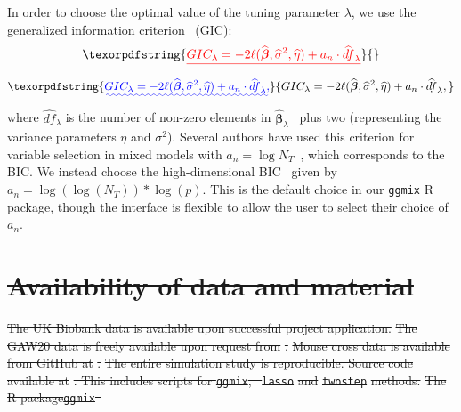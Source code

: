 \documentclass[10pt,letterpaper]{article}
\newcommand{\ggmix}{\texttt{ggmix}}
\newcommand{\bbeta}{\boldsymbol{\beta}}
\providecommand{\DIFaddtex}[1]{{\protect\color{blue}\uwave{#1}}} %
\providecommand{\DIFdeltex}[1]{{\protect\color{red}\sout{#1}}}                      %
\providecommand{\DIFaddbegin}{} %
\providecommand{\DIFaddend}{} %
\providecommand{\DIFdelbegin}{} %
\providecommand{\DIFdelend}{} %
\providecommand{\DIFadd}[1]{\texorpdfstring{\DIFaddtex{#1}}{#1}} %
\providecommand{\DIFdel}[1]{\texorpdfstring{\DIFdeltex{#1}}{}} %
\newcommand{\DIFscaledelfig}{0.5}
\newlength{\DIFdelgraphicswidth} %
\newlength{\DIFdelgraphicsheight} %
\newcommand{\DIFaddincludegraphics}[2][]{{\color{blue}\fbox{\DIFOincludegraphics[#1]{#2}}}} %
\newcommand{\DIFdelincludegraphics}[2][]{%
\sbox{\DIFdelgraphicsbox}{\DIFOincludegraphics[#1]{#2}}%
\settoboxwidth{\DIFdelgraphicswidth}{\DIFdelgraphicsbox} %
\settoboxtotalheight{\DIFdelgraphicsheight}{\DIFdelgraphicsbox} %
\scalebox{\DIFscaledelfig}{%
\parbox[b]{\DIFdelgraphicswidth}{\usebox{\DIFdelgraphicsbox}\\[-\baselineskip] \rule{\DIFdelgraphicswidth}{0em}}\llap{\resizebox{\DIFdelgraphicswidth}{\DIFdelgraphicsheight}{%
\setlength{\unitlength}{\DIFdelgraphicswidth}%
\begin{picture}(1,1)%
\thicklines\linethickness{2pt} %
{\color[rgb]{1,0,0}\put(0,0){\framebox(1,1){}}}%
{\color[rgb]{1,0,0}\put(0,0){\line( 1,1){1}}}%
{\color[rgb]{1,0,0}\put(0,1){\line(1,-1){1}}}%
\end{picture}%
}\hspace*{3pt}}} %
} %
\DeclareRobustCommand{\DIFaddbegin}{\DIFOaddbegin \let\includegraphics\DIFaddincludegraphics} %
\DeclareRobustCommand{\DIFaddend}{\DIFOaddend \let\includegraphics\DIFOincludegraphics} %
\DeclareRobustCommand{\DIFdelbegin}{\DIFOdelbegin \let\includegraphics\DIFdelincludegraphics} %
\DeclareRobustCommand{\DIFdelend}{\DIFOaddend \let\includegraphics\DIFOincludegraphics} %
\begin{document}
In order to choose the optimal value of the tuning parameter $\lambda$, we use the generalized information criterion~\cite{nishii1984asymptotic} (GIC):
\DIFdelbegin \begin{displaymath}
\DIFdel{GIC_{\lambda} = -2 \ell(\widehat{\bbeta}, \widehat{\sigma}^2, \widehat{\eta}) + a_n \cdot \widehat{df}_{\lambda}
}\end{displaymath}%
\DIFdelend \DIFaddbegin \begin{equation*}
\DIFadd{GIC_{\lambda} = -2 \ell(\widehat{\bbeta}, \widehat{\sigma}^2, \widehat{\eta}) + a_n \cdot \widehat{df}_{\lambda},
}\end{equation*}\DIFaddend 
where $\widehat{df}_{\lambda}$ is the number of non-zero elements in $\widehat{\bbeta}_{\lambda}$~\cite{zou2007degrees} plus two (representing the variance parameters $\eta$ and $\sigma^2$). Several authors have used this criterion for variable selection in mixed models with $a_n = \log N_T$~\cite{bondell2010joint,schelldorfer2011estimation}, which corresponds to the BIC. We instead choose the high-dimensional BIC~\cite{fan2013tuning} given by $a_n = \log(\log(N_T)) * \log(p)$. This is the default choice in our \texttt{ggmix} R package, though the interface is flexible to allow the user to select their choice of $a_n$.




\DIFdelbegin \section*{\DIFdel{Availability of data and material}}
\DIFdel{The UK Biobank data is available upon successful project application.
	}%
\DIFdel{The GAW20 data is freely available upon request from }%
\DIFdel{.
	}%
\DIFdel{Mouse cross data is available from GitHub at }%
\DIFdel{. 
	}%
\DIFdel{The entire simulation study is reproducible. Source code available at }%
\DIFdel{. This includes scripts for \ggmix , ~}\texttt{\DIFdel{lasso}} %
\DIFdel{and }\texttt{\DIFdel{twostep}} %
\DIFdel{methods. 
	}%
\DIFdel{The R package\ggmix ~}\DIFdelend \DIFaddbegin \subsection*{\DIFadd{Software availability}}
\end{document}
